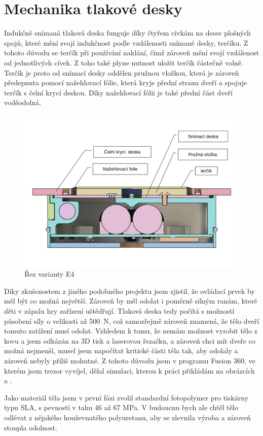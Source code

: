 \section{Mechanika tlakové desky}
\label{E4-mech_tlakovky}

Indukčně snímaná tlaková deska funguje díky čtyřem cívkám na desce ploš\-ných spojů, které mění svojí indukčnost podle vzdálenosti snímané desky, terčíku.
Z tohoto důvodu se terčík při používání naklání, čímž zároveň mění svojí vzdálenost od jednotlivých cívek. Z toho také plyne nutnost uložit terčík
částečně volně. Terčík je proto od snímací desky oddělen pružnou vložkou, která je zároveň předepnuta pomocí nažehlovací fólie, která kryje přední 
stranu dveří a spojuje terčík s čelní krycí deskou. Díky nažehlovací fólii je také přední část dveří voděodolná.

\begin{figure}[h]
    \centering
    \includegraphics[width=\textwidth]{kapitoly/obrazky/E4/machanika_tlakove_desky/rez_po_ose.pdf}
    \caption{Řez varianty E4}
    \label{fig:E4-rez}
\end{figure}

Díky zkušenostem z jiného podobného projektu jsem zjistil, že ovládací prvek by měl být co možná největší. 
Zároveň by měl odolat i poměrně silným ranám, které děti v zápalu hry zařízení uštědřují.
Tlaková deska tedy počítá s možností působení síly o velikosti až 500~N, což samozřejmě zároveň znamená, že tělo dveří tomuto zatížení musí odolat.
Vzhledem k tomu, že nemám možnost vyrobit tělo z kovu a jsem odkázán na 3D tisk a laserovou řezačku, a zároveň chci mít dveře co možná nejmenší,
musel jsem napočítat kritické části těla tak, aby odolaly a zároveň nebyly příliš mohutné. Z tohoto důvodu jsem v programu Fusion 360, ve kterém jsem trezor vyvíjel,
dělal simulaci, kterou k práci přikládám na obrázcích  a .

Jako materiál těla jsem v první fázi zvolil standardní fotopolymer pro tiskárny typu SLA, s pevností v tahu 46 až 67 MPa.
V budoucnu bych ale chtěl tělo odlévat z nějakého houževnatého polyuretanu, aby se zlevnila výroba a zároveň stoupla odolnost.

